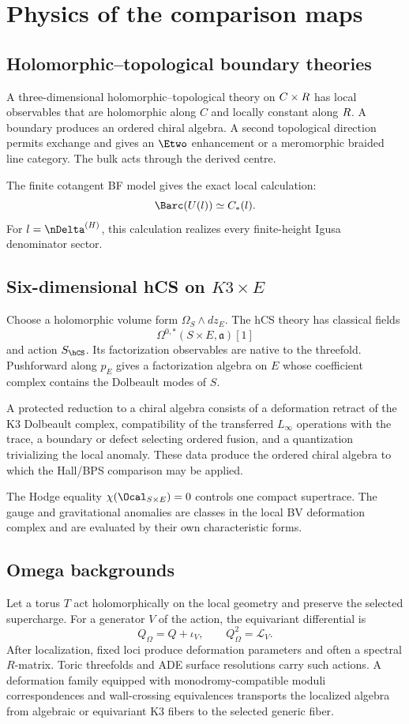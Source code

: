 \part[Physics]{Physics of the comparison maps}

\chapter{Holomorphic--topological boundary theories}
A three-dimensional holomorphic--topological theory on $C\times R$ has local observables that are holomorphic along $C$ and locally constant along $R$. A boundary produces an ordered chiral algebra. A second topological direction permits exchange and gives an $\Etwo$ enhancement or a meromorphic braided line category. The bulk acts through the derived centre.

The finite cotangent BF model gives the exact local calculation:
\[
 \Barc(U(\mathfrak l))\simeq C_*(\mathfrak l).
\]
For $\mathfrak l=\nDelta^{(H)}$, this calculation realizes every finite-height Igusa denominator sector.

\chapter{Six-dimensional hCS on \texorpdfstring{$K3\times E$}{K3 x E}}
Choose a holomorphic volume form $\Omega_S\wedge dz_E$. The hCS theory has classical fields
\[
 \Omega^{0,*}(S\times E,\mathfrak a)[1]
\]
and action $S_{\hCS}$. Its factorization observables are native to the threefold. Pushforward along $p_E$ gives a factorization algebra on $E$ whose coefficient complex contains the Dolbeault modes of $S$.

A protected reduction to a chiral algebra consists of a deformation retract of the K3 Dolbeault complex, compatibility of the transferred $L_\infty$ operations with the trace, a boundary or defect selecting ordered fusion, and a quantization trivializing the local anomaly. These data produce the ordered chiral algebra to which the Hall/BPS comparison may be applied.

The Hodge equality $\chi(\Ocal_{S\times E})=0$ controls one compact supertrace. The gauge and gravitational anomalies are classes in the local BV deformation complex and are evaluated by their own characteristic forms.

\chapter{Omega backgrounds}
Let a torus $T$ act holomorphically on the local geometry and preserve the selected supercharge. For a generator $V$ of the action, the equivariant differential is
\[
 Q_\Omega=Q+\iota_V,
 \qquad Q_\Omega^2=\mathcal L_V.
\]
After localization, fixed loci produce deformation parameters and often a spectral $R$-matrix. Toric threefolds and ADE surface resolutions carry such actions. A deformation family equipped with monodromy-compatible moduli correspondences and wall-crossing equivalences transports the localized algebra from algebraic or equivariant K3 fibers to the selected generic fiber.

